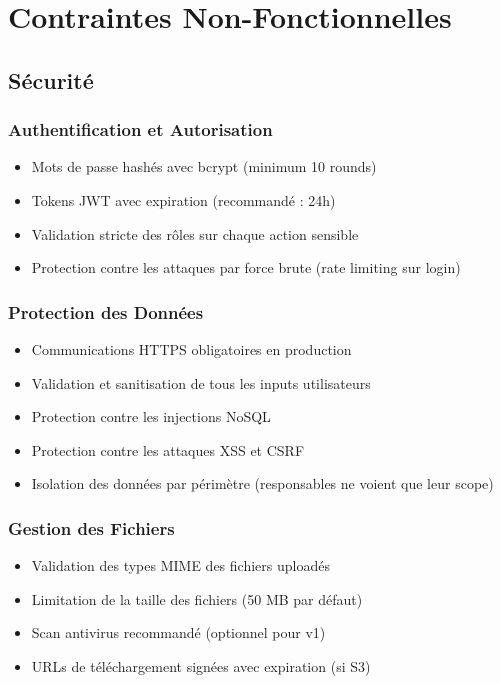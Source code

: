 \documentclass[12pt,a4paper]{article}
\begin{document}
\section{Contraintes Non-Fonctionnelles}

\subsection{Sécurité}

\subsubsection{Authentification et Autorisation}

\begin{itemize}[leftmargin=*]
    \item Mots de passe hashés avec bcrypt (minimum 10 rounds)
    \item Tokens JWT avec expiration (recommandé : 24h)
    \item Validation stricte des rôles sur chaque action sensible
    \item Protection contre les attaques par force brute (rate limiting sur login)
\end{itemize}

\subsubsection{Protection des Données}

\begin{itemize}[leftmargin=*]
    \item Communications HTTPS obligatoires en production
    \item Validation et sanitisation de tous les inputs utilisateurs
    \item Protection contre les injections NoSQL
    \item Protection contre les attaques XSS et CSRF
    \item Isolation des données par périmètre (responsables ne voient que leur scope)
\end{itemize}

\subsubsection{Gestion des Fichiers}

\begin{itemize}[leftmargin=*]
    \item Validation des types MIME des fichiers uploadés
    \item Limitation de la taille des fichiers (50 MB par défaut)
    \item Scan antivirus recommandé (optionnel pour v1)
    \item URLs de téléchargement signées avec expiration (si S3)
\end{itemize}
\end{document}
